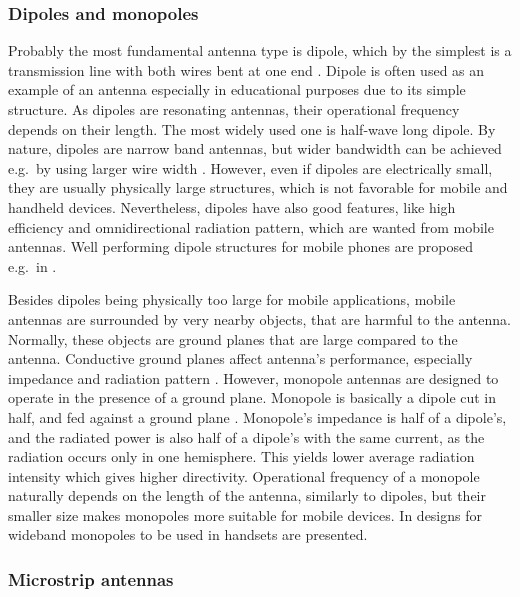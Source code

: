 \subsubsection{Dipoles and monopoles}
\label{sec:dipole}

Probably the most fundamental antenna type is dipole, which by the simplest is a transmission line with both wires bent at one end \cite{stutzman}. Dipole is often used as an example of an antenna especially in educational purposes due to its simple structure. As dipoles are resonating antennas, their operational frequency depends on their length. The most widely used one is half-wave long dipole.  By nature, dipoles are narrow band antennas, but wider bandwidth can be achieved e.g.\ by using larger wire width \cite{stutzman,balanis}. However, even if dipoles are electrically small, they are usually physically large structures, which is not favorable for mobile and handheld devices. Nevertheless, dipoles have also good features, like high efficiency and omnidirectional radiation pattern, which are wanted from mobile antennas. Well performing dipole structures for mobile phones are proposed e.g.\ in \cite{dipole_example1,dipole_example2}.

Besides dipoles being physically too large for mobile applications, mobile antennas are surrounded by very nearby objects, that are harmful to the antenna. Normally, these objects are ground planes that are large compared to the antenna. Conductive ground planes affect antenna's performance, especially impedance and radiation pattern \cite{stutzman}. However, monopole antennas are designed to operate in the presence of a ground plane. Monopole is basically a dipole cut in half, and fed against a ground plane \cite{stutzman}. Monopole's impedance is half of a dipole's, and the radiated power is also half of a dipole's with the same current, as the radiation occurs only in one hemisphere. This yields lower average radiation intensity which gives higher directivity. Operational frequency of a monopole naturally depends on the length of the antenna, similarly to dipoles, but their smaller size makes monopoles more suitable for mobile devices. In \cite{monopole_example1,monopole_example2} designs for wideband monopoles to be used in handsets are presented.

\subsubsection{Microstrip antennas}
\label{sec:microstrip}

